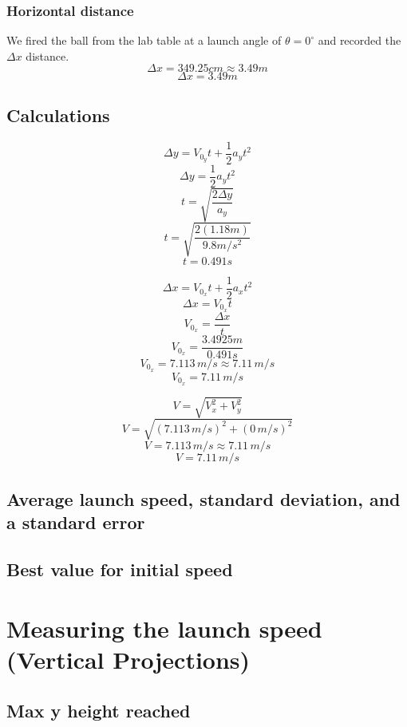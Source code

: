 \documentclass[11pt, letterpaper, includehead]{article}
\begin{document}
\subsubsection{Horizontal distance} %
We fired the ball from the lab table at a launch angle of $\theta = 0^{\circ}$ and recorded the $\Delta x$ distance.
$$\Delta x = 349.25cm \approx 3.49m$$
$$\boxed{\Delta x = 3.49m}$$

\subsection{Calculations} %
\begin{multicols}{3}
  $$\Delta y = V_{0_y}t + \frac{1}{2}a_yt^2$$
  $$\Delta y = \frac{1}{2}a_yt^2$$
  $$t = \sqrt{\frac{2\Delta y}{a_y}}$$
  $$t = \sqrt{\frac{2(1.18m)}{9.8 m/s^2}}$$
  $$\boxed{t = 0.491s}$$
  
  \columnbreak
  
  $$\Delta x = V_{0_x}t + \frac{1}{2}a_xt^2$$
  $$\Delta x = V_{0_x}t$$
  $$V_{0_x} = \frac{\Delta x}{t}$$
  $$V_{0_x} = \frac{3.4925m}{0.491s}$$
  $$V_{0_x} = 7.113 \, m/s \approx 7.11\,m/s$$
  $$\boxed{V_{0_x} = 7.11\,m/s}$$

  \columnbreak

  $$V = \sqrt{V_x^2 + V_y^2}$$
  $$V = \sqrt{(7.113 \, m/s)^2 + (0 \, m/s)^2}$$
  $$V = 7.113 \, m/s \approx 7.11 \, m/s$$
  $$\boxed{V = 7.11 \, m/s}$$
\end{multicols}

\subsection{Average launch speed, standard deviation, and a standard error} %

\subsection{Best value for initial speed} %
\section {Measuring the launch speed (Vertical Projections)} %
\subsection{Max y height reached} %
\end{document}
